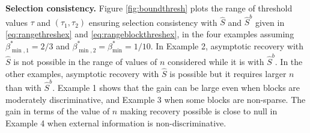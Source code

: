 \documentclass[bj,authoryear]{imsart}
\theoremstyle{plain}
\newcommand{\bs}{\boldsymbol}
\begin{document}

\smallskip
\noindent\textbf{Selection consistency.}
Figure \ref{fig:boundthresh} plots the range of threshold values $\tau$ and $(\tau_1,\tau_2)$ ensuring selection consistency with $\hat{S}$ and $\hat{S}^{b}$ given in \eqref{eq:rangethreshex} and \eqref{eq:rangeblockthreshex},
in the four examples assuming $\beta^*_{\min,1}=2/3$  and $\beta^*_{\min,2}=\beta^*_{\min}=1/10$. 
In Example 2, asymptotic recovery with $\hat{S}$ is not possible in the range of values of $n$ considered while it is with $\hat{S}^{b}$.
In the other examples, asymptotic recovery with $\hat{S}$ is possible but it requires larger $n$ than with $\hat{S}^b$.
Example 1 shows that the gain can be large even when blocks are moderately discriminative, and Example 3 when some blocks are non-sparse.
The gain in terms of the value of $n$ making recovery possible  is close to null in Example 4 when external information is non-discriminative. 
\end{document}
